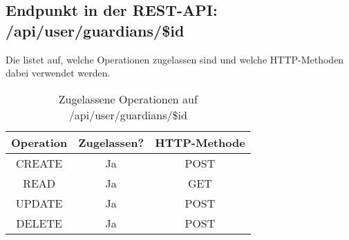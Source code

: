 \subsection{Endpunkt in der REST-API: /api/user/guardians/\$id}
Die  listet auf, welche Operationen zugelassen sind und welche HTTP-Methoden dabei verwendet werden. 

\begin{table}[!htbp]
	\begin{tabular}{|c|c|c|}
		\hline
			\textbf{Operation} & \textbf{Zugelassen?} & \textbf{HTTP-Methode} \\ \hline
			CREATE & Ja & POST \\ \hline 
			READ & Ja & GET \\ \hline
			UPDATE & Ja & POST \\ \hline 
			DELETE & Ja & POST \\ \hline
	\end{tabular}

		\caption{Zugelassene Operationen auf /api/user/guardians/\$id}
		\label{tab:end:rest:api:user:guardians:id:meth}
\end{table}

